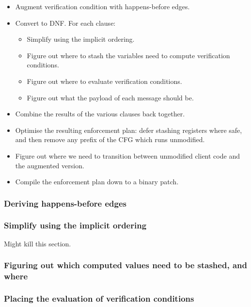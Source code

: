 \documentclass[12pt,a4paper]{book}
\begin{document}
\begin{itemize}
\item
  Augment verification condition with happens-before edges.
\item
  Convert to DNF.
  For each clause:
  \begin{itemize}
  \item
    Simplify using the implicit ordering.
  \item
    Figure out where to stash the variables need to compute verification conditions.
  \item
    Figure out where to evaluate verification conditions.
  \item
    Figure out what the payload of each message should be.
  \end{itemize}
\item
  Combine the results of the various clauses back together.
\item
  Optimise the resulting enforcement plan: defer stashing registers where safe, and then remove any prefix of the CFG which runs unmodified.
\item
  Figure out where we need to transition between unmodified client code and the augmented version.
\item
  Compile the enforcement plan down to a binary patch.
\end{itemize}

\subsubsection{Deriving happens-before edges}

\subsubsection{Simplify using the implicit ordering}
Might kill this section.

\subsubsection{Figuring out which computed values need to be stashed, and where}

\subsubsection{Placing the evaluation of verification conditions}
\end{document}

